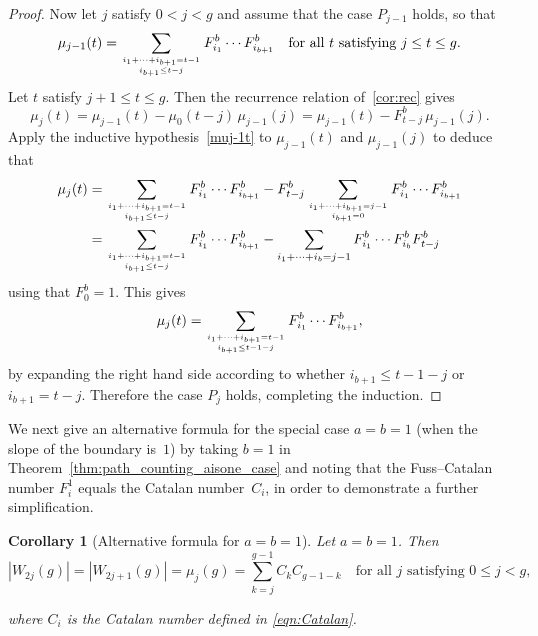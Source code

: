 \documentclass[11pt]{article}
\newtheorem{cor}[thm]{Corollary}
\theoremstyle{definition} %
\numberwithin{equation}{section}
\newcommand{\myatop}[2]{\genfrac{}{}{0pt}{}{#1}{#2}}
\begin{document}
\begin{proof}
Now let $j$ satisfy $0 < j < g$ and assume that the case $P_{j-1}$ holds,
so that
\begin{equation}
\label{muj-1t}
\mu_{j-1}(t) = \sum_{\myatop{i_1 + \cdots + i_{b+1} = t-1}{i_{b+1} \leq t-j}} F_{i_1}^b \cdots F_{i_{b+1}}^b \quad \mbox{for all $t$ satisfying $j \le t \le g$}.
\end{equation}
Let $t$ satisfy $j+1 \le t \le g$. Then the recurrence relation of~\cref{cor:rec} gives
\begin{equation}
    \mu_j(t) = \mu_{j-1}(t) - \mu_0(t-j) \, \mu_{j-1}(j) =  \mu_{j-1}(t) - F_{t-j}^b \, \mu_{j-1}(j). \label{eq:mujgnew} 
\end{equation}
Apply the inductive hypothesis~\eqref{muj-1t} to $\mu_{j-1}(t)$ and $\mu_{j-1}(j)$ to deduce that
\begin{align}
    \mu_j(t) &= \sum_{\myatop{i_1 + \cdots + i_{b+1} = t-1}{i_{b+1} \leq t - j}} F_{i_1}^b \cdots F_{i_{b+1}}^b  - F_{t-j}^b \sum_{\myatop{i_1 + \cdots + i_{b+1} = j-1}{i_{b+1} = 0}} F_{i_1}^b \cdots F_{i_{b+1}}^b \\
    &= \sum_{\myatop{i_1 + \cdots + i_{b+1} = t-1}{i_{b+1} \leq t - j}} F_{i_1}^b \cdots F_{i_{b+1}}^b  - \sum_{i_1 + \cdots + i_{b} = j-1} F_{i_1}^b \cdots F_{i_{b}}^b F_{t-j}^b
\end{align}
using that $F_0^b=1$. This gives
\[
    \mu_j(t) = \sum_{\myatop{i_1 + \cdots + i_{b+1} = t-1}{i_{b+1} \leq t-1-j}} F_{i_1}^b \cdots F_{i_{b+1}}^b, 
\]
by expanding the right hand side according to whether $i_{b+1} \le t-1-j$ or $i_{b+1} = t-j$. Therefore the case $P_j$ holds, completing the induction.
\end{proof}

We next give an alternative formula for the special case $a=b=1$ (when the slope of the 
boundary is~$1$) by taking $b=1$ in Theorem~\ref{thm:path_counting_aisone_case}
and noting that the Fuss--Catalan number $F_i^1$ equals the Catalan number~$C_i$,
in order to demonstrate a further simplification. 

\begin{cor}[Alternative formula for $a=b=1$]
    \label{cor:path_counting_aisbisone_case}
        Let $a=b=1$. Then
           \begin{equation}
                |W_{2j}(g)| = |W_{2j+1}(g)| = \mu_j(g) = \sum_{k = j}^{g-1} C_{k}  C_{g-1-k}
                               \quad\mbox{for all $j$ satisfying $0\le j< g$,}
            \end{equation}
                
where $C_i$ is the %
Catalan number defined in \eqref{eqn:Catalan}.
\end{cor}
\end{document}
